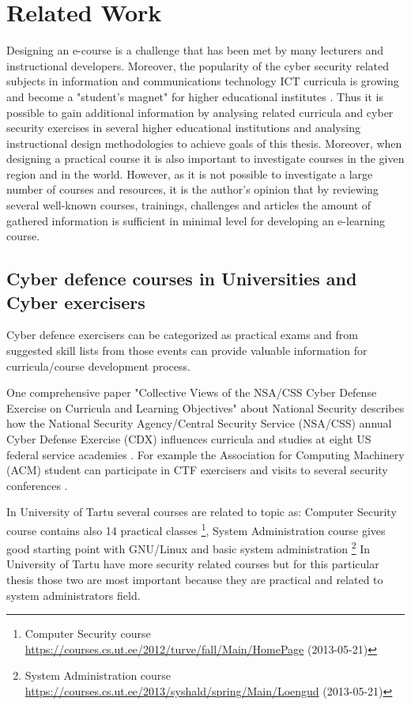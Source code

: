 \section{Related Work}
\label{Related Work}
Designing an e-course is a challenge that has been met by many lecturers and instructional developers. Moreover, the popularity of the cyber security related subjects in information and communications technology ICT curricula is growing and become a "student’s magnet" for higher educational institutes \citep{CyberIsHot}. Thus it is possible to gain additional information by analysing related curricula and cyber security exercises  in several higher educational institutions and analysing instructional design methodologies to achieve goals of this thesis. Moreover, when designing a practical course it is also important to investigate courses in the given region and in the world. However, as it is not possible to investigate a large number of courses and resources, it is the author’s opinion that by reviewing several well-known courses, trainings, challenges and articles the amount of gathered information is sufficient in minimal level for developing an e-learning course.


\subsection{Cyber defence courses in Universities and Cyber exercisers}
Cyber defence exercisers can be categorized as practical exams and from suggested skill lists from those events can provide valuable information for curricula/course development process.

One comprehensive paper "Collective Views of the NSA/CSS Cyber Defense Exercise
on Curricula and Learning Objectives" about National Security describes how the National Security
Agency/Central Security Service (NSA/CSS) annual Cyber Defense Exercise (\gls{CDX}) influences curricula and studies at eight US federal service academies \citep{adams_CDX_curricula}. For example the Association for Computing Machinery (ACM) student can participate in \gls{CTF} exercisers and  visits to several security conferences \citep{adams_CDX_curricula}.

In University of Tartu several courses are related to topic as: Computer Security course  contains also 14 practical classes \footnote{Computer Security course   \url{https://courses.cs.ut.ee/2012/turve/fall/Main/HomePage} (2013-05-21)}, System Administration course gives good starting point with GNU/Linux and basic system administration \footnote{ System Administration course  \url{https://courses.cs.ut.ee/2013/syshald/spring/Main/Loengud} (2013-05-21)}
In University of Tartu have more security related courses but for this particular thesis those two are most important because they are practical and related to system administrators field.

